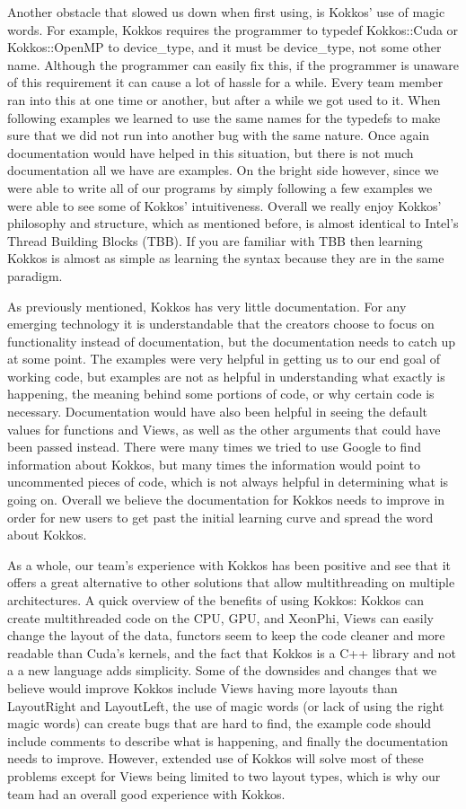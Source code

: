 Another obstacle that slowed us down when first using, is Kokkos' use of magic words. For example, Kokkos requires the programmer to typedef Kokkos::Cuda or Kokkos::OpenMP to device\_type, and it must be device\_type, not some other name. Although the programmer can easily fix this, if the programmer is unaware of this requirement it can cause a lot of hassle for a while. Every team member ran into this at one time or another, but after a while we got used to it. When following examples we learned to use the same names for the typedefs to make sure that we did not run into another bug with the same nature. Once again documentation would have helped in this situation, but there is not much documentation all we have are examples. On the bright side however, since we were able to write all of our programs by simply following a few examples we were able to see some of Kokkos' intuitiveness. Overall we really enjoy Kokkos' philosophy and structure, which as mentioned before, is almost identical to Intel's Thread Building Blocks (TBB). If you are familiar with TBB then learning Kokkos is almost as simple as learning the syntax because they are in the same paradigm. 

As previously mentioned, Kokkos has very little documentation. For any emerging technology it is understandable that the creators choose to focus on functionality instead of documentation, but the documentation needs to catch up at some point. The examples were very helpful in getting us to our end goal of working code, but examples are not as helpful in understanding what exactly is happening, the meaning behind some portions of code, or why certain code is necessary. Documentation would have also been helpful in seeing the default values for functions and Views, as well as the other arguments that could have been passed instead. There were many times we tried to use Google to find information about Kokkos, but many times the information would point to uncommented pieces of code, which is not always helpful in determining what is going on. Overall we believe the documentation for Kokkos needs to improve in order for new users to get past the initial learning curve and spread the word about Kokkos. 

As a whole, our team's experience with Kokkos has been positive and see that it offers a great alternative to other solutions that allow multithreading on multiple architectures. A quick overview of the benefits of using Kokkos: Kokkos can create multithreaded code on the CPU, GPU, and XeonPhi, Views can easily change the layout of the data, functors seem to keep the code cleaner and more readable than Cuda's kernels, and the fact that Kokkos is a C++ library and not a a new language adds simplicity. Some of the downsides and changes that we believe would improve Kokkos include Views having more layouts than LayoutRight and LayoutLeft, the use of magic words (or lack of using the right magic words) can create bugs that are hard to find, the example code should include comments to describe what is happening, and finally the documentation needs to improve. However, extended use of Kokkos will solve most of these problems except for Views being limited to two layout types, which is why our team had an overall good experience with Kokkos.

